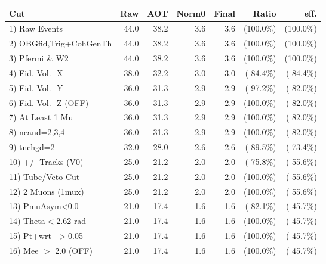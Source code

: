  \begin{table}[h!]\centering
 \begin{tabular}{||l||r|r|r|r|r|r||}
 \hline
 \hline
 Cut & Raw & AOT & Norm0 & Final & Ratio & eff.       \\
 \hline
  1) Raw Events           &         44.0 &         38.2 &          3.6 &          3.6 & (100.0\%) & (100.0\%) \\
  2) OBGfid,Trig+CohGenTh &         44.0 &         38.2 &          3.6 &          3.6 & (100.0\%) & (100.0\%) \\
  3) Pfermi \& W2         &         44.0 &         38.2 &          3.6 &          3.6 & (100.0\%) & (100.0\%) \\
  4) Fid. Vol. -X         &         38.0 &         32.2 &          3.0 &          3.0 & ( 84.4\%) & ( 84.4\%) \\
  5) Fid. Vol. -Y         &         36.0 &         31.3 &          2.9 &          2.9 & ( 97.2\%) & ( 82.0\%) \\
  6) Fid. Vol. -Z (OFF)   &         36.0 &         31.3 &          2.9 &          2.9 & (100.0\%) & ( 82.0\%) \\
  7) At Least 1 Mu        &         36.0 &         31.3 &          2.9 &          2.9 & (100.0\%) & ( 82.0\%) \\
  8) ncand=2,3,4          &         36.0 &         31.3 &          2.9 &          2.9 & (100.0\%) & ( 82.0\%) \\
  9) tnchgd=2             &         32.0 &         28.0 &          2.6 &          2.6 & ( 89.5\%) & ( 73.4\%) \\
 10) +/- Tracks (V0)      &         25.0 &         21.2 &          2.0 &          2.0 & ( 75.8\%) & ( 55.6\%) \\
 11) Tube/Veto Cut        &         25.0 &         21.2 &          2.0 &          2.0 & (100.0\%) & ( 55.6\%) \\
 12) 2 Muons (1mux)       &         25.0 &         21.2 &          2.0 &          2.0 & (100.0\%) & ( 55.6\%) \\
 13) PmuAsym<0.0          &         21.0 &         17.4 &          1.6 &          1.6 & ( 82.1\%) & ( 45.7\%) \\
 14) Theta$<$2.62 rad     &         21.0 &         17.4 &          1.6 &          1.6 & (100.0\%) & ( 45.7\%) \\
 15) Pt+wrt- $>$0.05      &         21.0 &         17.4 &          1.6 &          1.6 & (100.0\%) & ( 45.7\%) \\
 16) Mee $>$ 2.0  (OFF)   &         21.0 &         17.4 &          1.6 &          1.6 & (100.0\%) & ( 45.7\%) \\

\end{tabular}
\end{table}
